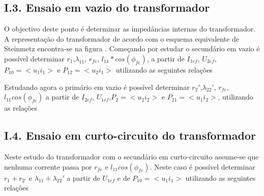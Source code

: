 \documentclass[%
  reprint,
  nofootinbib,
  amsmath,amssymb,
  aps,
  10pt,
]{revtex4-1}
\begin{document}

\subsection*{I.3. Ensaio em vazio do transformador}
O objectivo deste ponto é determinar as impedâncias internas do transformador. A representação do transformador de acordo com o esquema equivalente de Steinmetz encontra-se na figura .
Começando por estudar o secundário em vazio é possível determinar $r_1$,$\lambda_{11}$, $r_{fe}$, $l_{11}*cos(\phi_{fe})$, a partir de $I_{1ef}$, $U_{2ef}$, $P_{10}=<u_1 i_1>$ e $P_{12}=<u_2 i_1>$ utilizando as seguintes relações






Estudando agora o primário em vazio é possível determinar $r_2'$,$\lambda_{22}'$, $r_{fe}$, $l_{11}cos(\phi_{fe})$ a partir de $I_{2ef}$, $U_{1ef}$,$P_{2}=<u_2 i_2>$ e $P_{21}=<u_1 i_2>$, utilizando as relações







\subsection*{I.4. Ensaio em curto-circuito do transformador}
Neste estudo do transformador com o secundário em curto-circuito assume-se que nenhuma corrente passa por $r_{fe}$ e $l_{11}cos(\phi_{fe})$. Neste caso é possível determinar $r_1+r_{2'}$ e $\lambda_{11} + \lambda_{22}'$ a partir de $U_{1ef}$ e de $P_{10}=<u_1 i_1>$ utilizando as seguintes relações
\end{document}
